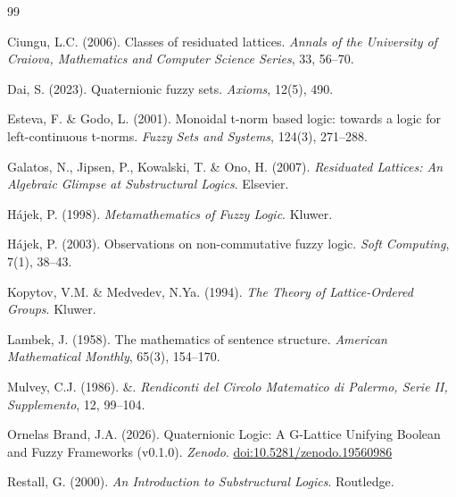 \documentclass[11pt,a4paper]{article}
\begin{document}



\begin{thebibliography}{99}

Ciungu, L.C. (2006).
Classes of residuated lattices.
\textit{Annals of the University of Craiova, Mathematics and Computer
Science Series}, 33, 56--70.

Dai, S. (2023).
Quaternionic fuzzy sets.
\textit{Axioms}, 12(5), 490.

Esteva, F. \& Godo, L. (2001).
Monoidal t-norm based logic: towards a logic for left-continuous t-norms.
\textit{Fuzzy Sets and Systems}, 124(3), 271--288.

Galatos, N., Jipsen, P., Kowalski, T. \& Ono, H. (2007).
\textit{Residuated Lattices: An Algebraic Glimpse at Substructural Logics}.
Elsevier.

H\'ajek, P. (1998).
\textit{Metamathematics of Fuzzy Logic}.
Kluwer.

H\'ajek, P. (2003).
Observations on non-commutative fuzzy logic.
\textit{Soft Computing}, 7(1), 38--43.

Kopytov, V.M. \& Medvedev, N.Ya. (1994).
\textit{The Theory of Lattice-Ordered Groups}.
Kluwer.

Lambek, J. (1958).
The mathematics of sentence structure.
\textit{American Mathematical Monthly}, 65(3), 154--170.

Mulvey, C.J. (1986).
\&.
\textit{Rendiconti del Circolo Matematico di Palermo, Serie II,
Supplemento}, 12, 99--104.

Ornelas Brand, J.A. (2026).
Quaternionic Logic: A G-Lattice Unifying Boolean and Fuzzy Frameworks (v0.1.0).
\textit{Zenodo}.
\href{https://doi.org/10.5281/zenodo.19560986}{doi:10.5281/zenodo.19560986}

Restall, G. (2000).
\textit{An Introduction to Substructural Logics}.
Routledge.

\end{thebibliography}
\end{document}
